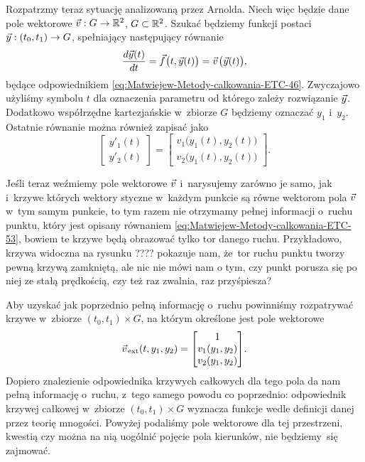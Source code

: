 \documentclass[a4paper,11pt]{article}
\numberwithin{equation}{section}
\begin{document}
Rozpatrzmy teraz sytuację analizowaną przez Arnolda. Niech więc będzie dane
pole wektorowe $\vec{v} : G \to \mathbb{R}^{ 2 }$, $G \subset \mathbb{R}^{ 2 }$. Szukać będziemy
funkcji postaci $\vec{y} : ( t_{ 0 }, t_{ 1 } ) \to G$, spełniający następujący
równanie
\begin{equation}
  \label{eq:Matwiejew-Metody-calkowania-ETC-54}
  \frac{ d \vec{y}( t ) }{ d t } =
  \vec{f} \hspace{0.05em} \big( t, \vec{y}( t ) \big) =
  \vec{v} \hspace{0.09em} \big( \vec{y}( t ) \big),
\end{equation}
będące odpowiednikiem \eqref{eq:Matwiejew-Metody-calkowania-ETC-46}.
Zwyczajowo użyliśmy symbolu $t$ dla oznaczenia parametru od którego zależy
rozwiązanie $\vec{y}$. Dodatkowo współrzędne kartezjańskie w~zbiorze $G$
będziemy oznaczać $y_{ 1 }$ i~$y_{ 2 }$. Ostatnie równanie można
również zapisać jako
\begin{equation}
  \label{eq:Matwiejew-Metody-calkowania-ETC-55}
  \begin{bmatrix}
    y'_{ 1 }( t ) \\
    y'_{ 2 }( t )
  \end{bmatrix} =
  \begin{bmatrix}
    v_{ 1 }\big( y_{ 1 }( t ), y_{ 2 }( t ) \big) \\
    v_{ 2 }\big( y_{ 1 }( t ), y_{ 2 }( t ) \big)
  \end{bmatrix}\!.
\end{equation}

Jeśli teraz weźmiemy pole wektorowe $\vec{v}$ i~narysujemy zarówno je samo,
jak i~krzywe których wektory styczne w~każdym punkcie są równe wektorom
pola $\vec{v}$ w~tym samym punkcie, to tym razem nie otrzymamy pełnej
informacji o~ruchu punktu, który jest opisany równaniem
\eqref{eq:Matwiejew-Metody-calkowania-ETC-53}, bowiem te krzywe będą
obrazować tylko tor danego ruchu. Przykładowo, krzywa widoczna na rysunku
????
pokazuje nam, że~tor ruchu punktu tworzy pewną krzywą zamkniętą, ale nic
nie mówi nam o tym, czy punkt porusza się po niej ze stałą prędkością,
czy też raz zwalnia, raz przyśpiesza?

Aby uzyskać jak poprzednio pełną informację o~ruchu powinniśmy rozpatrywać
krzywe w~zbiorze $( t_{ 0 }, t_{ 1 } ) \times G$, na którym określone jest pole
wektorowe
\begin{equation}
  \label{eq:Matwiejew-Metody-calkowania-ETC-56}
  \vec{v}_{ \, \textrm{ext} }( t, y_{ 1 }, y_{ 2 } ) =
  \begin{bmatrix}
    1 \\
    v_{ 1 }( y_{ 1 }, y_{ 2 } ) \\
    v_{ 2 }( y_{ 1 }, y_{ 2 } )
  \end{bmatrix}\!.
\end{equation}
Dopiero znalezienie odpowiednika krzywych całkowych dla tego pola da nam
pełną informację o~ruchu, z~tego samego powodu co poprzednio: odpowiednik
krzywej całkowej w~zbiorze $( t_{ 0 }, t_{ 1 } ) \times G$ wyznacza funkcje
wedle definicji danej przez teorię mnogości. Powyżej podaliśmy pole
wektorowe dla tej przestrzeni, kwestią czy można na nią uogólnić pojęcie
pola kierunków, nie będziemy~się zajmować.
\end{document}
